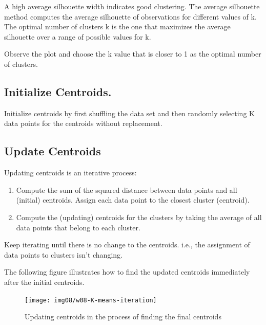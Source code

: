 \documentclass[
]{book}
\begin{document}
A high average silhouette width indicates good clustering. The average silhouette method computes the average silhouette of observations for different values of k. The optimal number of clusters k is the one that maximizes the average silhouette over a range of possible values for k.

Observe the plot and choose the k value that is closer to 1 as the optimal number of clusters.

\hypertarget{initialize-centroids.}{%
\subsection{Initialize Centroids.}\label{initialize-centroids.}}

Initialize centroids by first shuffling the data set and then randomly selecting K data points for the centroids without replacement.

\hypertarget{update-centroids}{%
\subsection{Update Centroids}\label{update-centroids}}

Updating centroids is an iterative process:

\begin{enumerate}
\def\labelenumi{\arabic{enumi}.}
\item
  Compute the sum of the squared distance between data points and all (initial) centroids. Assign each data point to the closest cluster (centroid).
\item
  Compute the (updating) centroids for the clusters by taking the average of all data points that belong to each cluster.
\end{enumerate}

Keep iterating until there is no change to the centroids. i.e., the assignment of data points to clusters isn't changing.

The following figure illustrates how to find the updated centroids immediately after the initial centroids.

\begin{figure}

{\centering \texttt{[image: img08/w08-K-means-iteration]} 

}

\caption{Updating centroids in the process of finding the final centroids}\label{fig:unnamed-chunk-193}
\end{figure}
\end{document}
